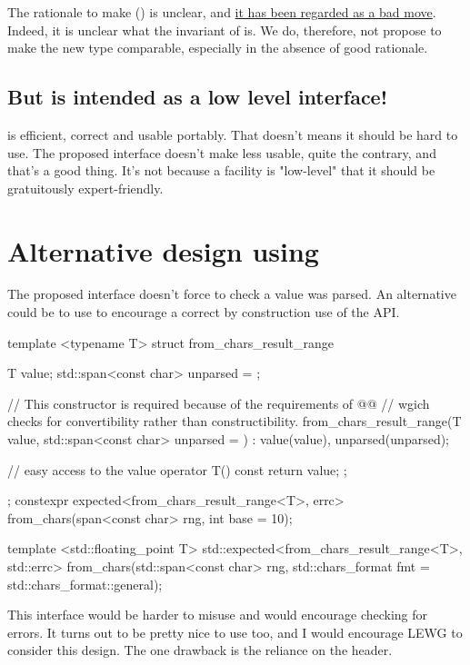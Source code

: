 \documentclass{wg21}
\begin{document}
The rationale to make  () is unclear, and \href{https://lists.isocpp.org/lib/2021/11/21141.php}{it has been regarded as a bad move}.
Indeed, it is unclear what the invariant of  is.
We do, therefore, not propose to make the new  type comparable, especially in the absence of good rationale.

\subsection{But  is intended as a low level interface!}

 is efficient, correct and usable portably. That doesn't means it should be hard to use.
The proposed interface doesn't make  less usable, quite the contrary, and that's a good thing.
It's not because a facility is "low-level" that it should be gratuitously expert-friendly.

\section{Alternative design using }
The proposed interface doesn't force to check a value was parsed.
An alternative could be to use  to encourage a correct by construction use of the API.
\begin{colorblock}
template <typename T>
struct from_chars_result_range {
    T value;
    std::span<const char> unparsed = {};

    // This constructor is required because of the requirements of @@
    // wgich checks for convertibility rather than constructibility.
    from_chars_result_range(T value, std::span<const char> unparsed = {})
    : value(value), unparsed(unparsed){};

    // easy access to the value
    operator T() const { return value; };
};
constexpr
expected<from_chars_result_range<T>, errc> from_chars(span<const char> rng, int base = 10);

template <std::floating_point T>
std::expected<from_chars_result_range<T>, std::errc>
from_chars(std::span<const char> rng, std::chars_format fmt = std::chars_format::general);
\end{colorblock}

This interface would be harder to misuse and would encourage checking for errors.
It turns out to be pretty nice to use too, and I would encourage LEWG to consider this design.
The one drawback is the reliance on the  header.
\end{document}
